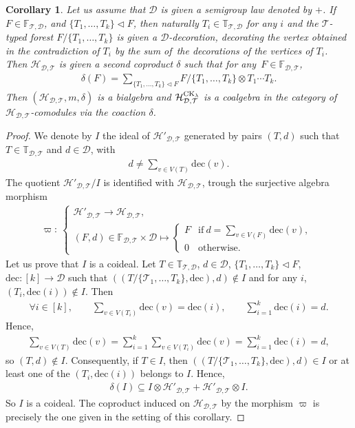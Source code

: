 \documentclass[10pt,a4paper]{amsart}
\numberwithin{equation}{section}
\newtheorem{Corollary}[Theorem]{Corollary}
\newcommand{\T}{\mathcal{T}}
\newcommand{\D}{\mathcal{D}}
\newcommand{\h}{\mathcal{H}}
\newcommand{\bfT}{\mathbb{T}}
\newcommand{\bfF}{\mathbb{F}}
\newcommand{\dec}{\mathrm{dec}}
\begin{document}
\begin{Corollary}
Let us assume that $\D$ is given a semigroup law denoted by $+$.
If $F\in \bfF_{\T,\D}$, and $\{T_1,\dots,T_k\}\triangleleft F$, then naturally
$T_i \in \bfT_{\T,\D}$ for any $i$ and the $\T$-typed forest $F/\{T_1,\dots,T_k\}$
is given a $\D$-decoration, decorating the vertex obtained in the contradiction of $T_i$
by the sum of~the decorations of the vertices of $T_i$. Then $\h_{\D,\T}$ is given a second coproduct $\delta$
such that for any~$F\in \bfF_{\D,\T}$,
\begin{gather*}
\delta(F)=\sum_{\{T_1,\dots,T_k\}\triangleleft F} F/\{T_1,\dots,T_k\}\otimes T_1\cdots T_k.
\end{gather*}
Then $(\h_{\D,\T},m,\delta)$ is a bialgebra and $\h_{\D,\T}^{{\rm CK}_\lambda}$ is a coalgebra
in the category of $\h_{\D,\T}$-comodules via the coaction $\delta$.
\end{Corollary}

\begin{proof}
We denote by $I$ the ideal of $\h'_{\D,\T}$ generated by pairs $(T,d)$ such that $T\in \bfT_{\D,\T}$
and $d\in \D$, with
\begin{gather*}
d\neq \sum_{v\in V(T)}\dec(v)
.\end{gather*}
The quotient $\h'_{\D,\T}/I$ is identified with $\h_{\D,\T}$, trough the surjective algebra morphism
\begin{gather*}\varpi\colon\ \begin{cases}
\h'_{\D,\T} \longrightarrow \h_{\D,\T},\\[1ex]
(F,d)\in \bfF_{\D,\T}\times \D \longmapsto \begin{cases}
\displaystyle F&\mbox{if}\ d=\sum_{v\in V(F)}\dec(v),\\
0&\mbox{otherwise}.
\end{cases}
\end{cases}
\end{gather*}
Let us prove that $I$ is a coideal. Let $T\in \bfT_{\T,\D}$, $d\in \D$,
$\{T_1,\dots,T_k\}\triangleleft F$, $\dec\colon [k]\longrightarrow \D$ such that
$((T/\{\T_1,\dots,T_k\},\dec),d)\notin I$ and for any $i$, $(T_i,\dec(i))\notin I$. Then
\begin{gather*}
\forall i\in [k],\qquad\sum_{v\in V(T_i)} \dec(v)=\dec(i),\qquad
\sum_{i=1}^k \dec(i)=d.
\end{gather*}
Hence,
\begin{gather*}
\sum_{v\in V(T)}\dec(v)=\sum_{i=1}^k \sum_{v\in V(T_i)} \dec(v)
=\sum_{i=1}^k \dec(i)=d,
\end{gather*}
so $(T,d)\notin I$. Consequently, if $T\in I$, then
$((T/\{\T_1,\dots,T_k\},\dec),d)\in I$ or at least one of the $(T_i,\dec(i))$ belongs to $I$.
Hence,
\begin{gather*}
\delta(I)\subseteq I\otimes \h'_{\D,\T}+\h'_{\D,\T}\otimes I.
\end{gather*}
So $I$ is a coideal. The coproduct induced on $\h_{\D,\T}$ by the morphism $\varpi$
is precisely the one given in the setting of this corollary.
\end{proof}\pagebreak
\end{document}
